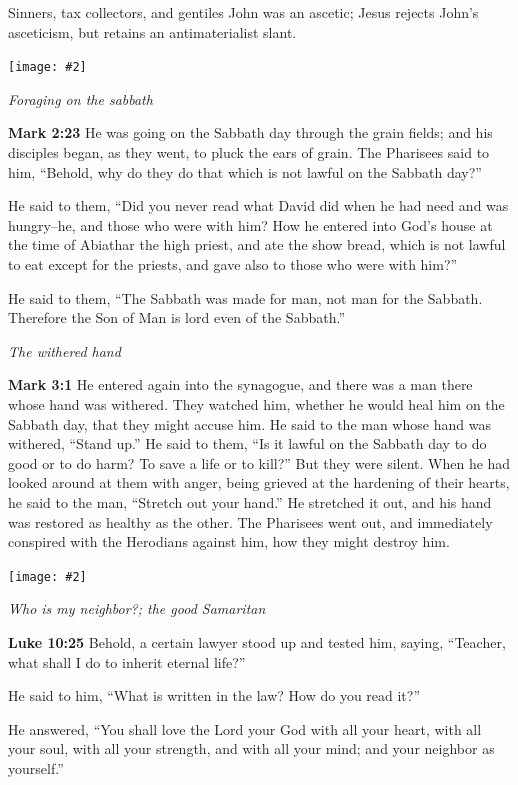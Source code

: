 \documentclass[10pt,twoside]{article} %
\newcommand{\fig}[2][0.4]{
    \ifthenelse{\isodd{\pageref{fig:#2}}}{}{\hfill}
    \texttt{[image: \#2]}\label{fig:#2}
    \ifthenelse{\isodd{\pageref{fig:#2}}}{\hfill}{}
    \par
}
\newcommand{\quotesize}{\normalsize{}}
\newcommand{\comm}[1]{\begingroup \color{black!50} #1\endgroup}
\newenvironment{quotetext}{\begingroup\quotesize}{\endgroup}
\newcommand{\bible}[2]{\begin{quotetext}\textbf{#1} #2\end{quotetext}}
\newcommand{\gospelmark}[2]{\bible{Mark #1}{#2}}
\newcommand{\luke}[2]{\bible{Luke #1}{#2}}
\newcommand{\subhead}[1]{\emph{#1}\par}
\begin{document}
\begin{section}{Sinners, tax collectors, and gentiles}
\comm{
John was an ascetic;
Jesus rejects John's asceticism, but retains an antimaterialist slant.
}

\fig{plucking-corn-on-the-sabbath}

\subhead{Foraging on the sabbath}

\gospelmark{2:23}{He was going on the Sabbath day through the grain fields; and his disciples began, as they went, to pluck the ears of grain.   The Pharisees said to him, ``Behold, why do they do that which is not lawful on the Sabbath day?''

  He said to them, ``Did you never read what David did when he had need and was hungry--he, and those who were with him?    How he entered into God's house at the time of Abiathar the high priest, and ate the show bread, which is not lawful to eat except for the priests, and gave also to those who were with him?''

  He said to them, ``The Sabbath was made for man, not man for the Sabbath.    Therefore the Son of Man is lord even of the Sabbath.'' 
}


\subhead{The withered hand}

\gospelmark{3:1}{
He entered again into the synagogue, and there was a man there whose hand was withered.   They watched him, whether he would heal him on the Sabbath day, that they might accuse him.   He said to the man whose hand was withered, ``Stand up.''   He said to them, ``Is it lawful on the Sabbath day to do good or to do harm? To save a life or to kill?'' But they were silent.   When he had looked around at them with anger, being grieved at the hardening of their hearts, he said to the man, ``Stretch out your hand.'' He stretched it out, and his hand was restored as healthy as the other.   The Pharisees went out, and immediately conspired with the Herodians against him, how they might destroy him.}

\fig[1]{good-samaritan}

\subhead{Who is my neighbor?; the good Samaritan}\label{good-samaritan}

\luke{10:25}{
Behold, a certain lawyer stood up and tested him, saying, ``Teacher, what shall I do to inherit eternal life?''

  He said to him, ``What is written in the law? How do you read it?''

  He answered, ``You shall love the Lord your God with all your heart, with all your soul, with all your strength, and with all your mind; and your neighbor as yourself.''

}
\end{section}
\end{document}
